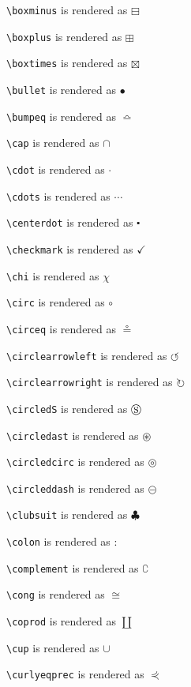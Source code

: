 \texttt{\textbackslash boxminus} is rendered as $\boxminus$

\texttt{\textbackslash boxplus} is rendered as $\boxplus$

\texttt{\textbackslash boxtimes} is rendered as $\boxtimes$

\texttt{\textbackslash bullet} is rendered as $\bullet$

\texttt{\textbackslash bumpeq} is rendered as $\bumpeq$

\texttt{\textbackslash cap} is rendered as $\cap$

\texttt{\textbackslash cdot} is rendered as $\cdot$

\texttt{\textbackslash cdots} is rendered as $\cdots$

\texttt{\textbackslash centerdot} is rendered as $\centerdot$

\texttt{\textbackslash checkmark} is rendered as $\checkmark$

\texttt{\textbackslash chi} is rendered as $\chi$

\texttt{\textbackslash circ} is rendered as $\circ$

\texttt{\textbackslash circeq} is rendered as $\circeq$

\texttt{\textbackslash circlearrowleft} is rendered as $\circlearrowleft$

\texttt{\textbackslash circlearrowright} is rendered as $\circlearrowright$

\texttt{\textbackslash circledS} is rendered as $\circledS$

\texttt{\textbackslash circledast} is rendered as $\circledast$

\texttt{\textbackslash circledcirc} is rendered as $\circledcirc$

\texttt{\textbackslash circleddash} is rendered as $\circleddash$

\texttt{\textbackslash clubsuit} is rendered as $\clubsuit$

\texttt{\textbackslash colon} is rendered as $\colon$

\texttt{\textbackslash complement} is rendered as $\complement$

\texttt{\textbackslash cong} is rendered as $\cong$

\texttt{\textbackslash coprod} is rendered as $\coprod$

\texttt{\textbackslash cup} is rendered as $\cup$

\texttt{\textbackslash curlyeqprec} is rendered as $\curlyeqprec$

